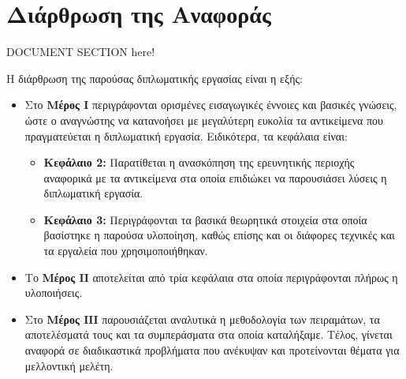 \section{Διάρθρωση της Αναφοράς}
\label{section:layout}

DOCUMENT SECTION here!

Η διάρθρωση της παρούσας διπλωματικής εργασίας είναι η εξής:

\begin{itemize}
  \item {Στο \textbf{Μέρος Ι} περιγράφονται ορισμένες εισαγωγικές έννοιες και
      βασικές γνώσεις, ώστε ο αναγνώστης να κατανοήσει με μεγαλύτερη ευκολία
      τα αντικείμενα που πραγματεύεται η διπλωματική εργασία.
      Ειδικότερα, τα κεφάλαια είναι:
      \begin{itemize}
        \item{\textbf{Κεφάλαιο 2:} Παρατίθεται η ανασκόπηση της ερευνητικής
            περιοχής αναφορικά με τα αντικείμενα στα οποία επιδιώκει να
            παρουσιάσει λύσεις η διπλωματική εργασία.
          }
        \item{\textbf{Κεφάλαιο 3:} Περιγράφονται τα βασικά θεωρητικά στοιχεία
            στα οποία βασίστηκε η παρούσα υλοποίηση, καθώς επίσης και οι
            διάφορες τεχνικές και τα εργαλεία που χρησιμοποιήθηκαν.
          }
      \end{itemize}
    }
  \item{Το \textbf{Μέρος ΙΙ} αποτελείται από τρία κεφάλαια στα οποία
      περιγράφονται πλήρως η υλοποιήσεις.
    }
  \item{Στο \textbf{Μέρος ΙΙΙ} παρουσιάζεται αναλυτικά η μεθοδολογία των
      πειραμάτων, τα αποτελέσματά τους και τα συμπεράσματα στα οποία καταλήξαμε.
      Τέλος, γίνεται αναφορά σε διαδικαστικά προβλήματα που ανέκυψαν
      και προτείνονται θέματα για μελλοντική μελέτη.
    }
\end{itemize}



